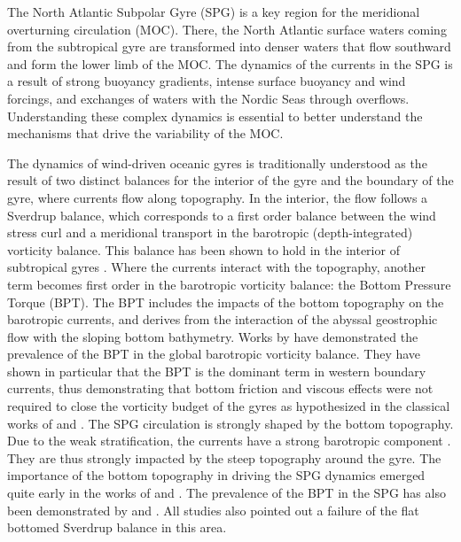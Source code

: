 \documentclass[os, manuscript]{copernicus}
\begin{document}
\introduction  %
The North Atlantic Subpolar Gyre (SPG) is a key region for the meridional overturning circulation (MOC). There, the North Atlantic surface waters coming from the subtropical gyre are transformed into denser waters that flow southward and form the lower limb of the MOC. The dynamics of the currents in the SPG is a result of strong buoyancy gradients, intense surface buoyancy and wind forcings, and exchanges of waters with the Nordic Seas through overflows. Understanding these complex dynamics is essential to better understand the mechanisms that drive the variability of the MOC. 

 The dynamics of wind-driven oceanic gyres is traditionally understood as the result of two distinct balances for the interior of the gyre and the boundary of the gyre, where currents flow along topography. In the interior, the flow follows a Sverdrup balance, which corresponds to a first order balance between the wind stress curl and a meridional transport in the barotropic (depth-integrated) vorticity balance. This balance has been shown to hold in the interior of subtropical gyres \citep{hughes2001, TDBAJS14, yeager2015, schoonover2016, sonnewald2019, LBST19}. Where the currents interact with the topography, another term becomes first order in the barotropic vorticity balance: the Bottom Pressure Torque (BPT). The BPT includes the impacts of the bottom topography on the barotropic currents, and derives from the interaction of the abyssal geostrophic flow with the sloping bottom bathymetry. Works by \citet{hughes2000,hughes2001, jackson2006, schoonover2016} have demonstrated the prevalence of the BPT in the global barotropic vorticity balance. They have shown in particular that the BPT is the dominant term in western boundary currents, thus demonstrating that bottom friction and viscous effects were not required to close the vorticity budget of the gyres as hypothesized in the classical works of \citet{stommel1948} and \citet{Munk1950}. The SPG circulation is strongly shaped by the bottom topography. Due to the weak stratification, the currents have a strong barotropic component \citep{vanaken1995,daniault2016,fischer2004}.  They are thus strongly impacted by the steep topography around the gyre. The importance of the bottom topography in driving the SPG dynamics emerged quite early in the works of \citet{luyten1985} and \citet{wunsch1985}. The prevalence of the BPT in the SPG has also been demonstrated by \citet{greatbatch1991,hughes2001, spence2012} and \citet{yeager2015}. All studies also pointed out a failure of the flat bottomed Sverdrup balance in this area. 
\end{document}
